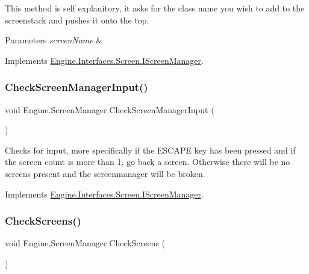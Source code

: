 This method is self explanitory, it asks for the class name you wish to add to the screenstack and pushes it onto the top. 


\begin{DoxyParams}{Parameters}
{\em screen\+Name} & \\
\hline
\end{DoxyParams}


Implements \hyperlink{a00470_aba0b8f29600dabc2a55dde4d5e00c7bc}{Engine.\+Interfaces.\+Screen.\+I\+Screen\+Manager}.

\mbox{\label{a00538_aa8e3ecdc7ae78094b07af944c31f90a9}} 
\subsubsection{\texorpdfstring{Check\+Screen\+Manager\+Input()}{CheckScreenManagerInput()}}
{\footnotesize\ttfamily void Engine.\+Screen\+Manager.\+Check\+Screen\+Manager\+Input (\begin{DoxyParamCaption}{ }\end{DoxyParamCaption})\hspace{0.3cm}{\ttfamily [inline]}}



Checks for input, more specifically if the E\+S\+C\+A\+PE key has been pressed and if the screen count is more than 1, go back a screen. Otherwise there will be no screens present and the screenmanager will be broken. 



Implements \hyperlink{a00470_a833b8050119cd9a87efbfa23197457c9}{Engine.\+Interfaces.\+Screen.\+I\+Screen\+Manager}.

\mbox{\label{a00538_abe1bf121b368a6d205706da54d949ace}} 
\subsubsection{\texorpdfstring{Check\+Screens()}{CheckScreens()}}
{\footnotesize\ttfamily void Engine.\+Screen\+Manager.\+Check\+Screens (\begin{DoxyParamCaption}{ }\end{DoxyParamCaption})\hspace{0.3cm}{\ttfamily [inline]}}



